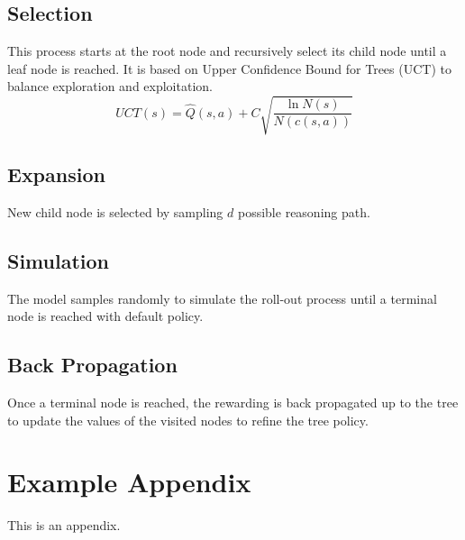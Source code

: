 \documentclass[11pt]{article}
\begin{document}
\subsection{Selection} This process starts at the root node and recursively select its child node until a leaf node is reached. It is based on Upper Confidence Bound for Trees (UCT) to balance exploration and exploitation\citep{10.1007/11871842_29}. 
\begin{equation}
    UCT(s) = \hat{Q}(s,a) + C \sqrt{\frac{\ln N(s)}{N(c(s,a))}}
\end{equation}

\subsection{Expansion}New child node is selected by sampling \(d\) possible reasoning path.
\subsection{Simulation}The model samples randomly to simulate the roll-out process until a terminal node is reached with default policy. 
\subsection{Back Propagation}Once a terminal node is reached, the rewarding is back propagated up to the tree to update the values of the visited nodes to refine the tree policy.



%


\appendix
\section{Example Appendix}
\label{sec:appendix}

This is an appendix.
\end{document}
